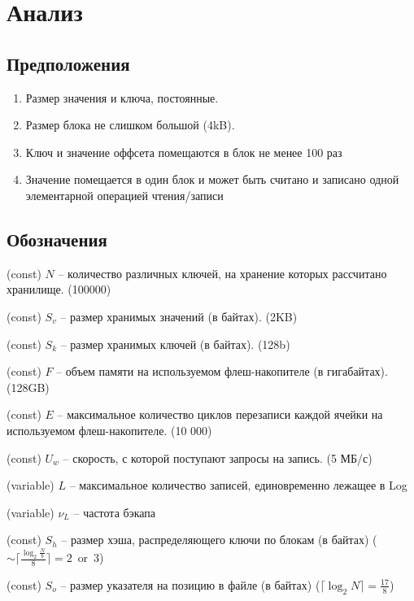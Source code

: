 \section*{Анализ}

\subsection*{Предположения}
\begin{enumerate}
	\item Размер значения и ключа, постоянные.
	
	\item Размер блока не слишком большой (4kB).
	
	\item Ключ и значение оффсета помещаются в блок не менее 100 раз
	
	\item Значение помещается в один блок и может быть считано и записано одной элементарной операцией чтения/записи
	
\end{enumerate}

\subsection*{Обозначения}

(const) $N$ -- количество различных ключей, на хранение которых рассчитано хранилище. (100000)

(const) $S_v$ -- размер хранимых значений (в байтах). (2KB)

(const) $S_k$ -- размер хранимых ключей (в байтах). (128b)

(const) $F$ -- объем памяти на используемом флеш-накопителе (в гигабайтах). (128GB)

(const) $E$ -- максимальное количество циклов перезаписи каждой ячейки на используемом флеш-накопителе. (10 000)

(const) $U_w$ -- скорость, с которой поступают запросы на запись. (5 МБ/с)

(variable) $L$ -- максимальное количество записей, единовременно лежащее в Log

(variable) $\nu_L$ -- частота бэкапа

(const) $S_h$ -- размер хэша, распределяющего ключи по блокам (в байтах) ($\sim\lceil\frac{\log_2 \frac{N}{b}}{8}\rceil = 2\ \operatorname{or}\ 3$)

(const) $S_o$ -- размер указателя на позицию в файле (в байтах) ($ \lceil\log_2N\rceil = \frac{17}{8}$)


